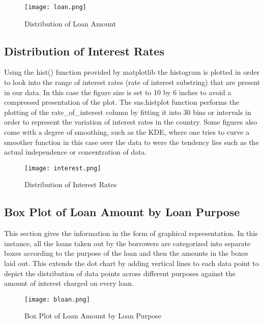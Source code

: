 \documentclass[12pt, a4paper,oneside]{book}
\numberwithin{equation}{section}
\begin{document}
 \begin{figure}[ht]
    \centering
    \texttt{[image: loan.png]}
    \caption{Distribution of Loan Amount}
    \label{fig:subsubsection}
\end{figure}
\FloatBarrier

\subsection{Distribution of Interest Rates}

Using the hist() function provided by matplotlib the histogram is plotted in order to look into the range of interest rates (rate of interest substring) that are present in our data. In this case the figure size is set to 10 by 6 inches to avoid a compressed presentation of the plot. The sns.histplot function performs the plotting of the rate\_of\_interest column by fitting it into 30 bins or intervals in order to   represent the variation of interest rates in the country. Some figures also come with a degree of smoothing, such as the KDE, where one tries to curve a smoother function in this case over the data to were the tendency lies such as the actual independence or concentration of data.

\begin{figure}[ht]
    \centering
    \texttt{[image: interest.png]}
    \caption{Distribution of Interest Rates}
    \label{fig:subsubsection}
\end{figure}
\FloatBarrier

\subsection{Box Plot of Loan Amount by Loan Purpose}

This section gives the information in the form of graphical representation. In this instance, all the loans taken out by the borrowers are categorized into separate boxes according to the purpose of the loan and then the amounts in the boxes laid out. This extends the dot chart by adding vertical lines to each data point to depict the distribution of data points across different purposes against the amount of interest charged on every loan.

\begin{figure}[ht]
    \centering
    \texttt{[image: bloan.png]}
    \caption{Box Plot of Loan Amount by Loan Purpose}
    \label{fig:subsubsection}
\end{figure}
\FloatBarrier
\end{document}
